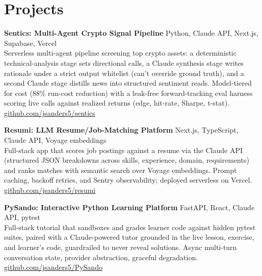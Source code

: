 \documentclass[10.5pt, letterpaper]{article}
\begin{document}
\section{Projects}

\noindent\textbf{Sentics: Multi-Agent Crypto Signal Pipeline}
\hfill\textcolor{muted}{\small Python, Claude API, Next.js, Supabase, Vercel}\\
Serverless multi-agent pipeline screening top crypto assets: a deterministic
technical-analysis stage sets directional calls, a Claude synthesis stage writes
rationale under a strict output whitelist (can't override ground truth), and a
second Claude stage distills news into structured sentiment reads. Model-tiered
for cost (88\% run-cost reduction) with a leak-free forward-tracking eval harness
scoring live calls against realized returns (edge, hit-rate, Sharpe, t-stat).
\hfill\textcolor{muted}{\small\href{https://github.com/jsanders5/sentics}{github.com/jsanders5/sentics}}

\vspace{5pt}

\noindent\textbf{Resumi: LLM Resume/Job-Matching Platform}
\hfill\textcolor{muted}{\small Next.js, TypeScript, Claude API, Voyage embeddings}\\
Full-stack app that scores job postings against a resume via the Claude API
(structured JSON breakdowns across skills, experience, domain, requirements) and
ranks matches with semantic search over Voyage embeddings. Prompt caching,
backoff retries, and Sentry observability; deployed serverless on Vercel.
\hfill\textcolor{muted}{\small\href{https://github.com/jsanders5/resumi}{github.com/jsanders5/resumi}}

\vspace{5pt}

\noindent\textbf{PySando: Interactive Python Learning Platform}
\hfill\textcolor{muted}{\small FastAPI, React, Claude API, pytest}\\
Full-stack tutorial that sandboxes and grades learner code against hidden pytest
suites, paired with a Claude-powered tutor grounded in the live lesson, exercise,
and learner's code, guardrailed to never reveal solutions. Async multi-turn
conversation state, provider abstraction, graceful degradation.
\hfill\textcolor{muted}{\small\href{https://github.com/jsanders5/PySando}{github.com/jsanders5/PySando}}
\end{document}
